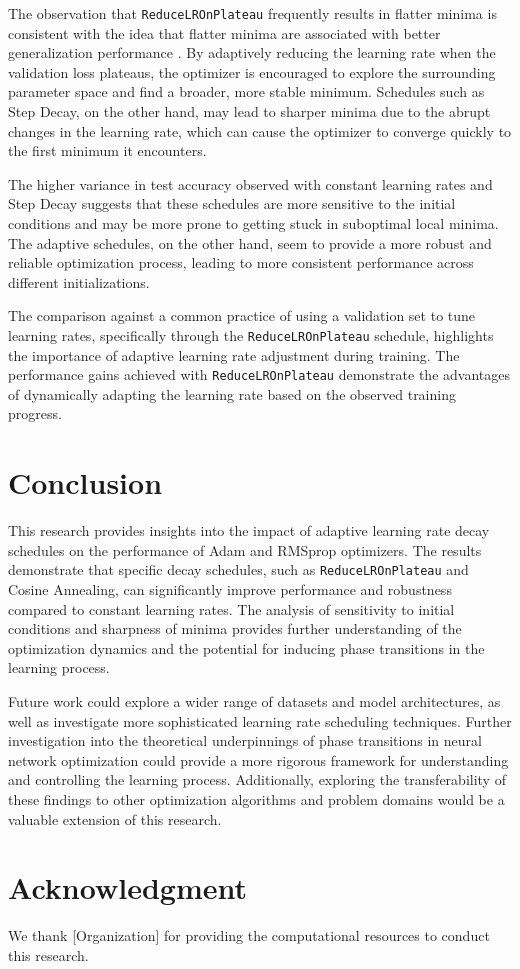 \documentclass[conference]{IEEEtran}
\begin{document}
The observation that \texttt{ReduceLROnPlateau} frequently results in flatter minima is consistent with the idea that flatter minima are associated with better generalization performance \cite{hochreiter1997flat}.  By adaptively reducing the learning rate when the validation loss plateaus, the optimizer is encouraged to explore the surrounding parameter space and find a broader, more stable minimum. Schedules such as Step Decay, on the other hand, may lead to sharper minima due to the abrupt changes in the learning rate, which can cause the optimizer to converge quickly to the first minimum it encounters.

The higher variance in test accuracy observed with constant learning rates and Step Decay suggests that these schedules are more sensitive to the initial conditions and may be more prone to getting stuck in suboptimal local minima.  The adaptive schedules, on the other hand, seem to provide a more robust and reliable optimization process, leading to more consistent performance across different initializations.

The comparison against a common practice of using a validation set to tune learning rates, specifically through the \texttt{ReduceLROnPlateau} schedule, highlights the importance of adaptive learning rate adjustment during training. The performance gains achieved with \texttt{ReduceLROnPlateau} demonstrate the advantages of dynamically adapting the learning rate based on the observed training progress.

\section{Conclusion}

This research provides insights into the impact of adaptive learning rate decay schedules on the performance of Adam and RMSprop optimizers. The results demonstrate that specific decay schedules, such as \texttt{ReduceLROnPlateau} and Cosine Annealing, can significantly improve performance and robustness compared to constant learning rates. The analysis of sensitivity to initial conditions and sharpness of minima provides further understanding of the optimization dynamics and the potential for inducing phase transitions in the learning process.

Future work could explore a wider range of datasets and model architectures, as well as investigate more sophisticated learning rate scheduling techniques.  Further investigation into the theoretical underpinnings of phase transitions in neural network optimization could provide a more rigorous framework for understanding and controlling the learning process.  Additionally, exploring the transferability of these findings to other optimization algorithms and problem domains would be a valuable extension of this research.

\section*{Acknowledgment}
We thank [Organization] for providing the computational resources to conduct this research.



\end{document}

